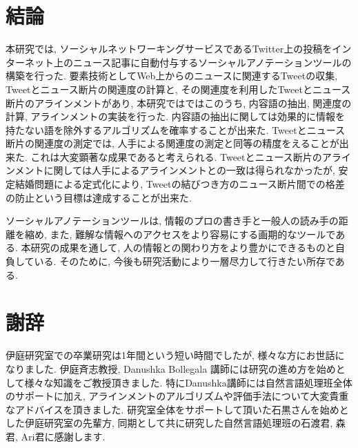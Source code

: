 \documentclass[12pt]{jarticle}
\begin{document}
\section{結論}
本研究では, ソーシャルネットワーキングサービスであるTwitter上の投稿をインターネット上のニュース記事に自動付与するソーシャルアノテーションツールの構築を行った. 要素技術としてWeb上からのニュースに関連するTweetの収集, Tweetとニュース断片の関連度の計算と, その関連度を利用したTweetとニュース断片のアラインメントがあり, 本研究ではではこのうち, 内容語の抽出, 関連度の計算, アラインメントの実装を行った. 内容語の抽出に関しては効果的に情報を持たない語を除外するアルゴリズムを確率することが出来た. Tweetとニュース断片の関連度の測定では, 人手による関連度の測定と同等の精度をえることが出来た. これは大変顕著な成果であると考えられる. Tweetとニュース断片のアラインメントに関しては人手によるアラインメントとの一致は得られなかったが, 安定結婚問題による定式化により, Tweetの結びつき方のニュース断片間での格差の防止という目標は達成することが出来た.

ソーシャルアノテーションツールは, 情報のプロの書き手と一般人の読み手の距離を縮め, また, 難解な情報へのアクセスをより容易にする画期的なツールである. 本研究の成果を通して, 人の情報との関わり方をより豊かにできるものと自負している. そのために, 今後も研究活動により一層尽力して行きたい所存である.

\clearpage
\section{謝辞}
伊庭研究室での卒業研究は1年間という短い時間でしたが, 様々な方にお世話になりました. 伊庭斉志教授, Danushka Bollegala 講師には研究の進め方を始めとして様々な知識をご教授頂きました.
特にDanushka講師には自然言語処理班全体のサポートに加え, アラインメントのアルゴリズムや評価手法について大変貴重なアドバイスを頂きました.
研究室全体をサポートして頂いた石黒さんを始めとした伊庭研究室の先輩方, 同期として共に研究した自然言語処理班の石渡君, 森君, Ari君に感謝します.
\end{document}
